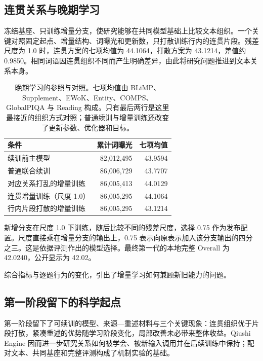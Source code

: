 \subsection{连贯关系与晚期学习}

冻结基座、只训练增量分支，使研究能够在共同模型基础上比较文本组织。一个关键对照固定起点、增量结构、词曝光和更新数，只打散训练行内的连贯片段。残差尺度为 1.0 时，连贯方案的七项均值为 44.1064，打散方案为 43.1214，差值约 0.9850。相同词语因连贯组织不同而产生明确差异，由此将研究问题推进到文本关系本身。

\begin{table}[htbp]
\caption{晚期学习的参照与对照。七项均值由 BLiMP、Supplement、EWoK、Entity、COMPS、GlobalPIQA 与 Reading 构成。只有最后两行是这里最接近的组织方式对照；普通续训与增量训练还改变了更新参数、优化器和目标。}
\label{tab:late}
\small
\begin{tabularx}{\linewidth}{@{}Yrr@{}}
\toprule 条件 & 累计词曝光 & 七项均值\\\midrule
续训前主模型 & 82,012,495 & 43.9594\\
普通联合续训 & 86,006,729 & 43.7707\\
对应关系打乱的增量训练 & 86,005,413 & 44.0129\\
连贯增量训练（尺度 1.0） & 86,005,295 & 44.1064\\
行内片段打散的增量训练 & 86,005,295 & 43.1214\\
\bottomrule
\end{tabularx}
\end{table}

新增分支在尺度 1.0 下训练，随后比较不同的残差尺度，选择 0.75 作为发布配置。尺度直接乘在增量分支的输出上，0.75 表示向原表示加入该分支输出的四分之三。这是依据评测作出的模型选择。最终第一代的本地完整 Overall 为 42.0240，公开显示为 42.02。

综合指标与逐题行为的变化，引出了增量学习如何兼顾新旧能力的问题。

\subsection{第一阶段留下的科学起点}

第一阶段留下了可续训的模型、来源—重述材料与三个关键现象：连贯组织优于片段打散，紧凑重述的优势随学习阶段变化，局部改善未必带来整体收益。Qiushi Engine 因而进一步研究关系如何被学会、被新输入调用并在后续训练中保持；配对文本、共同基座和完整评测构成了机制实验的基础。
